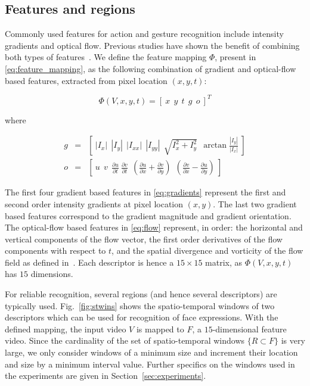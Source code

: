 \documentclass[10pt,twocolumn,letterpaper]{article}
\newcommand{\fig}[1]{\mbox{Fig.~\ref{#1}}}
\newcommand{\eqsize}{\footnotesize}
\begin{document}
\subsection{Features and regions}
\label{sec:features}
\vspace{-1ex}

Commonly used features for action and gesture recognition include intensity gradients and optical flow.
Previous studies have shown the benefit of combining both types of features~\cite{DollarEtAl2005,WangEtAl2009}.
We define the feature mapping {\eqsize $\Phi$},
present in \eqref{eq:feature_mapping},
as the following combination of gradient and optical-flow based features,
extracted from pixel location {\eqsize $(x,y,t)$}:

\vspace{-1ex}
\eqsize
\begin{equation}
  \Phi(V,x,y,t) = [ ~ x ~~ y ~~ t ~~ g ~~ o ~ ]^T
\end{equation}
\normalsize

\noindent
where
\vspace{-2ex}

\noindent
\eqsize
\begin{eqnarray}
\label{eq:gradients}
  g &=& \left[ ~ |I_x| ~~ |I_y| ~~ |I_{xx}| ~~ |I_{yy}| ~~ \sqrt{I_x^2 + I_y^2} ~~ \arctan\frac{|I_y|}{|I_x|} ~ \right]\\
\label{eq:flow}
  o &=& \left[ ~ u ~~ v ~~ \frac{\partial u}{\partial t} ~ \frac{\partial v}{\partial t} ~~
             \left( \frac{\partial u}{\partial x} + \frac{\partial v}{\partial y} \right) ~~
             \left( \frac{\partial v}{\partial x} - \frac{\partial u}{\partial y} \right) ~ \right]
\end{eqnarray}
\normalsize

The first four gradient based features in \eqref{eq:gradients} represent the first and second order intensity gradients at pixel location {\eqsize
$(x,y)$}. The last two gradient based features correspond to the gradient magnitude and gradient orientation. The optical-flow based features in
\eqref{eq:flow} represent, in order: the horizontal and vertical components of the flow vector,
the first order derivatives of the flow components with respect to {\eqsize $t$},
and the spatial divergence and vorticity of the flow field as defined in~\cite{AliAndShah2010}.
Each descriptor is hence a {\eqsize $15 \times 15$} matrix, as {\eqsize $\Phi(V,x,y,t)$} has {\eqsize $15$} dimensions.

For reliable recognition, several regions (and hence several descriptors) are typically used.
\fig{fig:stwins} shows the spatio-temporal windows of two descriptors which can be used for recognition of face expressions.
With the defined mapping, the input video {\small $V$} is mapped to {\small $F$}, a {\small $15$}-dimensional feature video.
Since the cardinality of the set of spatio-temporal windows {\eqsize $\{ R \subset F \}$} is very large,
we only consider windows of a minimum size and increment their location and size by a minimum interval value.
Further specifics on the windows used in the experiments are given in Section~\ref{sec:experiments}.
\end{document}

